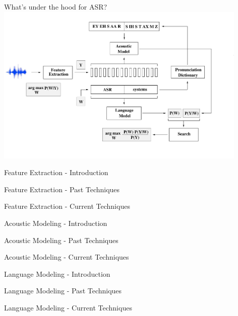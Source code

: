 \begin{frame}{What's under the hood for ASR?}
\includegraphics[height=77mm]{figures/ASR9}
\end{frame}

\begin{frame}{Feature Extraction - Introduction}
\end{frame}

\begin{frame}{Feature Extraction - Past Techniques}
\end{frame}

\begin{frame}{Feature Extraction - Current Techniques}
\end{frame}

\begin{frame}{Acoustic Modeling - Introduction}
\end{frame}

\begin{frame}{Acoustic Modeling - Past Techniques}
\end{frame}

\begin{frame}{Acoustic Modeling - Current Techniques}
\end{frame}

\begin{frame}{Language Modeling - Introduction}
\end{frame}

\begin{frame}{Language Modeling - Past Techniques}
\end{frame}

\begin{frame}{Language Modeling - Current Techniques}
\end{frame}

